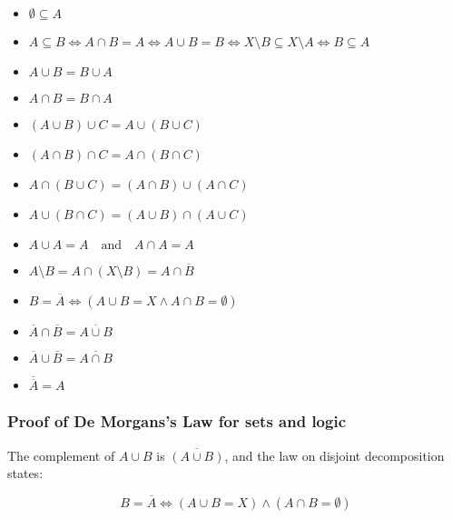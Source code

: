 \begin{itemize}
	
	\item \(\emptyset \subseteq A\)
	
	\item \(A \subseteq B \iff A \cap B = A \iff A \cup B = B \iff X \setminus B \subseteq X 
		  \setminus A \iff B \subseteq A\)
	
	\item \(A \cup B = B \cup A\) 
	
	\item \(A \cap B = B \cap A\) 
	
	\item \((A \cup B) \cup C = A \cup (B \cup C)\) 
	
	\item \((A \cap B) \cap C = A \cap (B \cap C)\) 
	
	\item \(A \cap (B \cup C) = (A \cap B) \cup (A \cap C)\) 
	
	\item \(A \cup (B \cap C) = (A \cup B) \cap (A \cup C)\) 
		
	\item \(A \cup A = A \quad \text{and} \quad A \cap A = A\)
	
	\item \(A \setminus B = A \cap (X \setminus B) = A \cap \overline{B}\)
	
	\item \(B = \overline{A} \iff (A \cup B = X \land A \cap B = \emptyset)\) 
	
	\item \(\overline{A} \cap \overline{B} = \overline{A \cup B}\) 
	
	\item \(\overline{A} \cup \overline{B} = \overline{A \cap B}\) 
	
	\item \(\overline{\overline{A}} = A\)

\end{itemize}

\subsubsection{Proof of De Morgans's Law for sets and logic}

The complement of \( A \cup B \) is \( \overline{(A \cup B)} \), and the law on disjoint decomposition 
states:

\[
	B = \overline{A} \iff (A \cup B = X) \land (A \cap B = \emptyset)
\]

